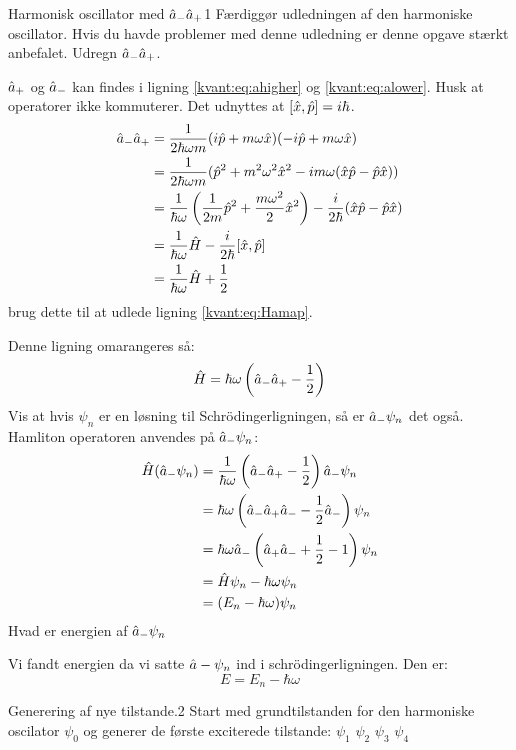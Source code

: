 
\begin{opgave}{Harmonisk oscillator med $\hat a_- \hat a_+$}{1}
\label{kvant:opg:amap}
Færdiggør udledningen af den harmoniske oscillator. Hvis du havde problemer med denne udledning er denne opgave stærkt anbefalet.
\opg Udregn $\hat a_-\hat a_+$.

$\hat a_+$ og $\hat a_-$ kan findes i ligning \eqref{kvant:eq:ahigher} og \eqref{kvant:eq:alower}. Husk at operatorer ikke kommuterer. Det udnyttes at $[\hat x,\hat p] = i\hbar$.
\begin{align*}
    \hat a_-\hat a_+ &= \frac{1}{2\hbar\omega m}(i\hat p+m\omega \hat x)(-i\hat p+m\omega \hat x)\\
    &= \frac{1}{2\hbar\omega m}(\hat p^2+m^2\omega^2\hat x^2-im\omega(\hat x\hat p-\hat p\hat x))\\
    &= \frac{1}{\hbar \omega}\left(\frac{1}{2m}\hat p^2+\frac{m\omega^2}{2}\hat x^2\right)-\frac{i}{2\hbar}(\hat x\hat p-\hat p\hat x)\\
    &=\frac{1}{\hbar\omega}\hat H-\frac{i}{2\hbar}[\hat x,\hat p]\\
    &=\frac{1}{\hbar\omega}\hat H+\frac{1}{2}
\end{align*}
\opg brug dette til at udlede ligning \eqref{kvant:eq:Hamap}.

Denne ligning omarangeres så:
$$
\hat H = \hbar\omega\left(\hat a_-\hat a_+-\frac{1}{2}\right)
$$
\opg Vis at hvis $\psi_n$ er en løsning til Schrödingerligningen, så er $\hat a_-\psi_n$ det også.
Hamliton operatoren anvendes på $\hat a_-\psi_n$:
\begin{align*}
    \hat H(\hat a_-\psi_n) &= \frac{1}{\hbar\omega}\left(\hat a_- \hat a_+ -\frac{1}{2}\right)\hat a_-\psi_n\\
    &= {\hbar\omega}\left(\hat a_-\hat a_+\hat a_- - \frac{1}{2}\hat a_-\right)\psi_n\\
    &= {\hbar\omega}\hat a_-\left(\hat a_+\hat a_-+\frac{1}{2}-1\right)\psi_n\\
    &= \hat H\psi_n-\hbar\omega\psi_n\\
    &= (E_n-\hbar\omega)\psi_n
\end{align*}
\opg Hvad er energien af $\hat a_- \psi_n$

Vi fandt energien da vi satte $\hat a-\psi_n$ ind i schrödingerligningen. Den er:
$$
E=E_n-\hbar\omega
$$
\end{opgave}

\begin{opgave}{Generering af nye tilstande.}{2}
Start med grundtilstanden for den harmoniske oscilator $\psi_0$ og generer de første exciterede tilstande:
\opg $\psi_1$
\opg $\psi_2$
\opg $\psi_3$
\opg $\psi_4$
\end{opgave}

